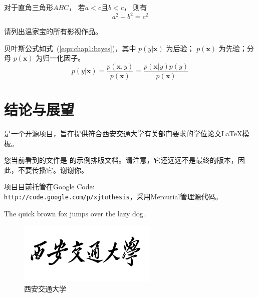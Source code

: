 \documentclass[
    doctor,
    pdflinks,
    ]{xjtuthesis}
\begin{document}
            \begin{theorem}
              \rm 对于直角三角形$ABC$， 若$a<c$且$b<c$， 则有
                \begin{equation}
                  a^2+b^2=c^2
                \end{equation}
            \end{theorem}


            \begin{exercise}
                  \rm 请列出温家宝的所有影视作品。
            \end{exercise}
                
            贝叶斯公式如式~(\ref{equ:chap1:bayes})，其中 $p(y|\mathbf{x})$ 为后验；
            $p(\mathbf{x})$ 为先验；分母 $p(\mathbf{x})$ 为归一化因子。
            \begin{equation}
                \label{equ:chap1:bayes}
                p(y|\mathbf{x}) = \frac{p(\mathbf{x},y)}{p(\mathbf{x})}=
                \frac{p(\mathbf{x}|y)p(y)}{p(\mathbf{x})} 
            \end{equation}


    \chapter{结论与展望}

        \xjtuthesis 是一个开源项目，旨在提供符合西安交通大学有关部门要求的学位论文\LaTeX 模板。

        您当前看到的文件是 \xjtuthesis{} \metaversion 的示例排版文档。请注意，它还远远不是最终的版本，因此，不要传播它。谢谢你。

        \xjtuthesis 项目目前托管在Google Code:\\ \verb|http://code.google.com/p/xjtuthesis|，采用Mercurial管理源代码。


    \xjtuappendix



                The quick brown fox jumps over the lazy dog.

                \begin{figure}[h!]
                  \centering
                  \includegraphics[width=6.67cm]{XJTU.pdf}
                  \caption{西安交通大学}
                  \label{fig:in-appendix}
                \end{figure}
\end{document}

